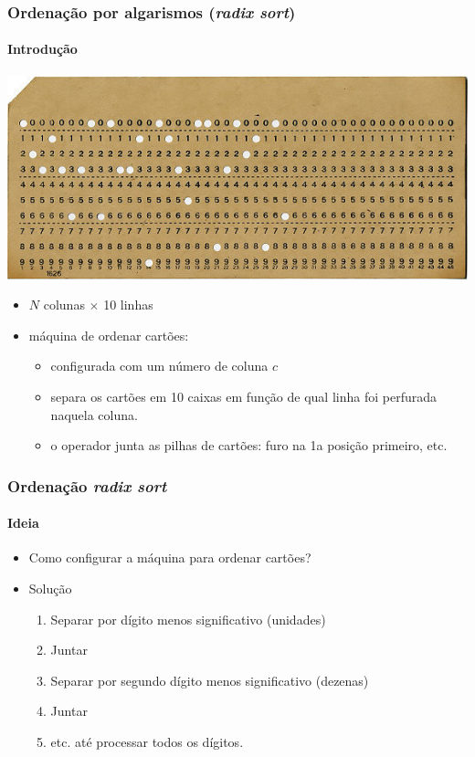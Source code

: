 \documentclass{beamer}
\begin{document}
\begin{frame}

\frametitle{Ordenação por algarismos (\textit{radix sort\/})}
\framesubtitle{Introdução}

\begin{center}
\includegraphics[width=.8\textwidth]{img/punched-card.jpg}

\end{center}

\begin{itemize}
\item $N$ colunas $\times$ 10 linhas
\item máquina de ordenar cartões: 
\begin{itemize}
  \item configurada com um número de coluna $c$
  \item separa os cartões em 10 caixas em função de qual linha foi perfurada naquela coluna.
  \item o operador junta as pilhas de cartões: furo na 1a posição primeiro, etc.
\end{itemize}
\end{itemize}
\end{frame}

\begin{frame}
  \frametitle{Ordenação \textit{radix sort\/}}
  \framesubtitle{Ideia}
  \begin{itemize}
    \item Como configurar a máquina para ordenar cartões?
      \pause
    \item Solução
      \begin{enumerate}
      \item Separar por dígito menos significativo (unidades)
      \item Juntar
      \item Separar por segundo dígito menos significativo (dezenas)
      \item Juntar
      \item etc. até processar todos os dígitos.
      \end{enumerate}
  \end{itemize}
\end{frame}
\end{document}
